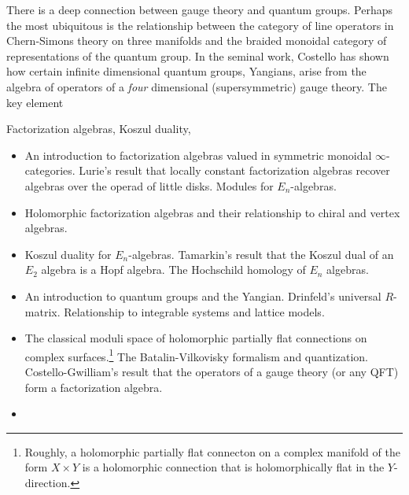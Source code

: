\documentclass[10pt]{article}
\title{}
\author{Brian R. Williams}
\begin{document}
\maketitle

There is a deep connection between gauge theory and quantum groups.
Perhaps the most ubiquitous is the relationship between the category of line operators in Chern-Simons theory on three manifolds and the braided monoidal category of representations of the quantum group.
In the seminal work, Costello \cite{CosInt, CosYangian} has shown how certain infinite dimensional quantum groups, Yangians, arise from the algebra of operators of a {\em four} dimensional (supersymmetric) gauge theory.
The key element 

Factorization algebras, Koszul duality, 


\begin{itemize}
\item An introduction to factorization algebras valued in symmetric monoidal $\infty$-categories. Lurie's result that locally constant factorization algebras recover algebras over the operad of little disks.
Modules for $E_n$-algebras.\cite{CG1, LurieHA, FrancisAyalaTopMan}
\item Holomorphic factorization algebras and their relationship to chiral and vertex algebras. \cite{CG1, BD}
\item Koszul duality for $E_n$-algebras.
Tamarkin's \cite{Tamarkin} result that the Koszul dual of an $E_2$ algebra is a Hopf algebra.
The Hochschild homology of $E_n$ algebras. \cite{FrancisAyala, ...}
\item An introduction to quantum groups and the Yangian.
Drinfeld's universal $R$-matrix. \cite{Etingof, ChariPressley}
Relationship to integrable systems and lattice models.
\item The classical moduli space of holomorphic partially flat connections on complex surfaces.\footnote{Roughly, a holomorphic partially flat connecton on a complex manifold of the form $X \times Y$ is a holomorphic connection that is holomorphically flat in the $Y$-direction.}
The Batalin-Vilkovisky formalism and quantization.
Costello-Gwilliam's result that the operators of a gauge theory (or any QFT) form a factorization algebra. \cite{CosBook, CG2, CosYangian}
\item 
\end{itemize}



%
%
%  
%
\end{document}

